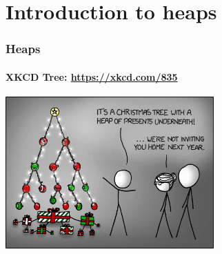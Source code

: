 \section{Introduction to heaps}
\label{sec:introduction_to_heaps}

\begin{frame}
	\frametitle{Heaps}
	\framesubtitle{XKCD Tree: \url{https://xkcd.com/835}}
	\begin{center}
		\includegraphics[width=0.6\textwidth]{figures/tree.png}\\
	\end{center}
\end{frame}

